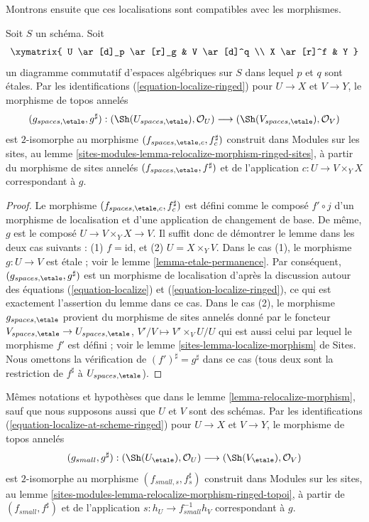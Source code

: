 \medskip\noindent
Montrons ensuite que ces localisations sont compatibles avec les morphismes.

\begin{lemma}
\label{lemma-relocalize-morphism}
Soit $S$ un schéma. Soit
$$
\xymatrix{
U \ar[d]_p \ar[r]_g & V \ar[d]^q \\
X \ar[r]^f & Y
}
$$
un diagramme commutatif d'espaces algébriques sur $S$ dans lequel $p$ et $q$ sont \'etales.
Par les identifications
(\ref{equation-localize-ringed}) pour $U \to X$ et $V \to Y$,
le morphisme de topos annelés
$$
(g_{spaces, \etale}, g^\sharp) :
(\Sh(U_{spaces, \etale}), \mathcal{O}_U)
\longrightarrow
(\Sh(V_{spaces, \etale}), \mathcal{O}_V)
$$
est $2$-isomorphe au morphisme $(f_{spaces, \etale, c}, f_c^\sharp)$
construit dans
Modules sur les sites, au
lemme \ref{sites-modules-lemma-relocalize-morphism-ringed-sites},
à partir du morphisme de sites annelés
$(f_{spaces, \etale}, f^\sharp)$ et de
l'application $c : U \to V \times_Y X$ correspondant à $g$.
\end{lemma}

\begin{proof}
Le morphisme $(f_{spaces, \etale, c}, f_c^\sharp)$ est défini comme le
composé $f' \circ j$
d'un morphisme de localisation et d'une application de changement de base. De même, $g$ est le composé
$U \to V \times_Y X \to V$. Il suffit donc de démontrer
le lemme dans les deux cas suivants : (1) $f = \text{id}$, et
(2) $U = X \times_Y V$. Dans le cas (1), le morphisme $g : U \to V$ est
\'etale ; voir le
lemme \ref{lemma-etale-permanence}.
Par conséquent, $(g_{spaces, \etale}, g^\sharp)$ est un morphisme de localisation
d'après la discussion autour des
équations (\ref{equation-localize}) et
(\ref{equation-localize-ringed}),
ce qui est exactement l'assertion du lemme dans ce cas.
Dans le cas (2), le morphisme $g_{spaces, \etale}$
provient du morphisme de sites annelés donné par le foncteur
$V_{spaces, \etale} \to U_{spaces, \etale}$,
$V'/V \mapsto V' \times_V U/U$
qui est aussi celui par lequel le morphisme $f'$ est défini ; voir le
lemme \ref{sites-lemma-localize-morphism} de Sites.
Nous omettons la vérification de $(f')^\sharp = g^\sharp$
dans ce cas (tous deux sont la restriction de $f^\sharp$
à $U_{spaces, \etale}$).
\end{proof}

\begin{lemma}
\label{lemma-relocalize-morphism-at-schemes}
Mêmes notations et hypothèses que dans le
lemme \ref{lemma-relocalize-morphism},
sauf que nous supposons aussi que $U$ et $V$ sont des schémas.
Par les identifications
(\ref{equation-localize-at-scheme-ringed})
pour $U \to X$ et $V \to Y$, le morphisme de topos annelés
$$
(g_{small}, g^\sharp) :
(\Sh(U_\etale), \mathcal{O}_U)
\longrightarrow
(\Sh(V_\etale), \mathcal{O}_V)
$$
est $2$-isomorphe au morphisme $(f_{small, s}, f_s^\sharp)$
construit dans
Modules sur les sites, au
lemme \ref{sites-modules-lemma-relocalize-morphism-ringed-topoi},
à partir de $(f_{small}, f^\sharp)$ et de
l'application $s : h_U \to f_{small}^{-1}h_V$ correspondant à $g$.
\end{lemma}

